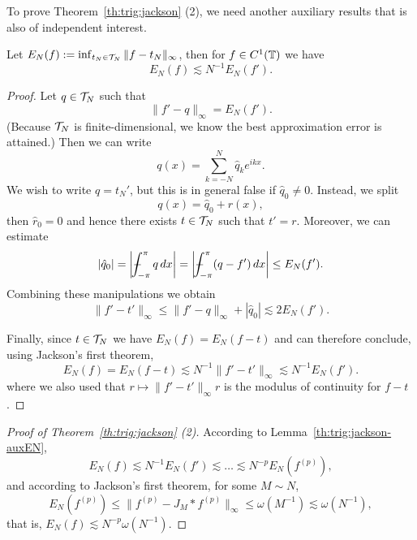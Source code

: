 To prove Theorem~\ref{th:trig:jackson} (2), we need another auxiliary
results that is also of independent interest.

\begin{lemma} \label{th:trig:jackson-auxEN}
  Let $E_N(f) := \inf_{t_N \in \mathcal{T}_N} \|f - t_N \|_\infty$, then for
  $f \in C^1(\mathbb{T})$ we have
  \[
    E_N(f) \lesssim N^{-1} E_N(f').
  \]
\end{lemma}
\begin{proof}
  Let $q \in \mathcal{T}_N$ such that
  \[
    \|f' - q\|_\infty = E_N(f').
  \]
  (Because $\mathcal{T}_N$ is finite-dimensional, we know the best approximation
  error is attained.) Then we can write
  \[
    q(x) = \sum_{k = -N}^N \hat{q}_{k} e^{ikx}.
  \]
  We wish to write $q =  t_N'$, but this is in general false if $\hat{q}_0 \neq 0$. Instead, we split
  \[
    q(x) = \hat{q}_0 + r(x),
  \]
  then $\hat{r}_0 = 0$ and hence there exists $t \in \mathcal{T}_N$ such  that $t' =  r$. Moreover, we can estimate
  \[
    |\hat{q}_0| = \bg| \mint_{-\pi}^\pi q \,dx \bg|
      = \bg| \mint_{-\pi}^\pi (q-f') \,dx \bg|
      \leq E_N(f').
  \]
  Combining these manipulations we obtain
  \[
    \| f' - t'\|_\infty
    \leq
    \| f' - q \|_\infty + |\hat{q}_0|
    \lesssim 2 E_N(f').
  \]

  Finally, since $t \in \mathcal{T}_N$ we have $E_N(f) = E_N(f - t)$ and can therefore conclude, using Jackson's first theorem,
  \[
    E_N(f) = E_N(f - t)
    \lesssim N^{-1} \|f' - t'\|_\infty
    \lesssim N^{-1} E_N(f').
  \]
  where we also used that $r \mapsto \|f'-t'\|_\infty r$ is the modulus of continuity for $f - t$.
\end{proof}


\begin{proof}[Proof of Theorem~\ref{th:trig:jackson} (2)]
  According to Lemma~\ref{th:trig:jackson-auxEN},
  \[
    E_N(f) \lesssim N^{-1} E_N(f') \lesssim \dots \lesssim 
    N^{-p} E_N(f^{(p)}),
  \]
  and according to Jackson's first theorem, for some $M \sim N$,
  \[
    E_N(f^{(p)}) \leq \| f^{(p)} - J_M \ast f^{(p)} \|_\infty
      \leq \omega(M^{-1}) \lesssim \omega(N^{-1}),
  \]
  that is, $E_N(f) \lesssim N^{-p} \omega(N^{-1})$.
\end{proof}






